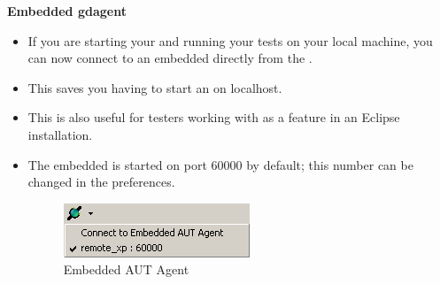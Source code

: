 
\textbf{Embedded gdagent{}}\\
\begin{itemize}
\item If you are starting your \gdaut{} and running your tests on your local machine, 
you can now connect to an embedded \gdagent{} directly from the \ite. 
\item This saves you having to start an \gdagent{} on localhost. 
\item This is also useful for testers working with \jb{} as a feature in an Eclipse installation. 
\item The embedded \gdagent{} is started on port 60000 by default; this number can be changed in the preferences.

\begin{figure}[h]
\begin{center}
\includegraphics{52/ps/EmbeddedAgent}
\caption{Embedded AUT Agent}
\label{RNEmbeddedAgent}
\end{center}
\end{figure}


\end{itemize}


